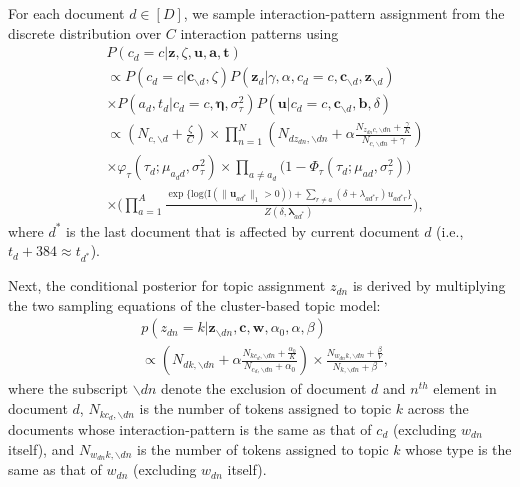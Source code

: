 \documentclass{article}
\begin{document}
For each document $d \in [D]$, we sample interaction-pattern assignment from the discrete distribution over $C$ interaction patterns using 
\begin{equation}
\begin{aligned}
&P(c_d = c|\boldsymbol{z}, \zeta, \boldsymbol{u},\boldsymbol{a}, \boldsymbol{t})
\\&\propto P(c_d=c|\boldsymbol{c}_{\backslash d}, \zeta) P(\boldsymbol{z}_d|\gamma, \alpha, c_d=c, \boldsymbol{c}_{\backslash d}, \boldsymbol{z}_{\backslash d})\\&\times P(a_d, t_d|c_d = c, \boldsymbol{\eta}, \sigma_\tau^2) P(\boldsymbol{u}|c_d=c, \boldsymbol{c}_{\backslash d}, \boldsymbol{b}, \delta) 
\\&\propto (N_{c, \backslash d}+\frac{\zeta}{C}) \times\prod_{n=1}^N (N_{dz_{dn}, \backslash dn}+\alpha \frac{N_{z_{dn}c,\backslash dn}+\frac{\gamma}{K}}{N_{c, \backslash dn}+\gamma})\\&\times
\varphi_{\tau}(\tau_{d}; \mu_{a_d d}, \sigma_\tau^2)\times \prod_{a\neq a_d}\big(1-\Phi_{\tau}(\tau_{d}; \mu_{a d}, \sigma_\tau^2) \big)\\& 
\times \Big(
\prod_{a=1}^A \frac{\exp\Big\{\mbox{log}\big(\text{I}( \lVert \boldsymbol{u}_{ad^*}\rVert_1 > 0)\big) + \sum\limits_{r \neq a} (\delta+\lambda_{ad^*r})u_{ad^*r}\Big\}}{Z(\delta,\boldsymbol{\lambda}_{ad^*})}\Big),
\end{aligned}
\end{equation}
where $d^*$ is the last document that is affected by current document $d$ (i.e., $t_d + 384 \approx t_{d^*}$). 

Next, the conditional posterior for topic assignment $z_{dn}$ is derived by multiplying the two sampling equations of the cluster-based topic model:
\begin{equation}
\begin{aligned}
&p(z_{dn}=k| \boldsymbol{z}_{\backslash dn}, \boldsymbol{c}, \boldsymbol{w}, \alpha_0, \alpha, \beta)\\
&\propto 
(N_{dk, \backslash dn}+\alpha \frac{N_{kc_d,\backslash dn}+\frac{\alpha_0}{K}}{N_{c_d, \backslash dn}+\alpha_0})\times 	  \frac{N_{w_{dn}k, \backslash dn}+\frac{\beta}{V}}{N_{k, \backslash dn}+\beta},
\end{aligned}
\end{equation}
where the subscript $\backslash dn$ denote the exclusion of document $d$ and $n^{th}$ element in document $d$, $N_{kc_d, \backslash dn}$ is the number of tokens assigned to topic $k$ across the documents whose interaction-pattern is the same as that of $c_{d}$ (excluding $w_{dn}$ itself), and $N_{w_{dn}k, \backslash dn}$ is the number of tokens assigned to topic $k$ whose type is the same as that of $w_{dn}$ (excluding $w_{dn}$ itself). 
\end{document}
